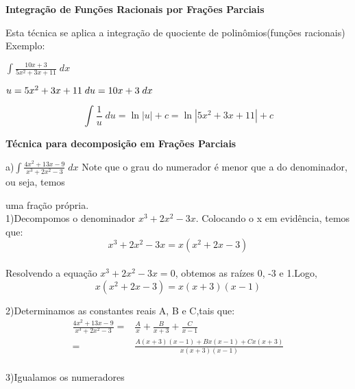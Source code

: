\documentclass[11pt]{article}
\begin{document}
\noindent
    \begin{center}
    {\Large{\bf Integração de Funções Racionais por Frações Parciais}}
    \end{center}
\vspace{.5cm}

Esta técnica se aplica a integração de quociente de polinômios(funções racionais)\\Exemplo:

\begin{center}
\begin{minipage}[c]{6cm}
 $\displaystyle\int\frac{10x+3}{5x^{2}+3x+11}\; dx$
\end{minipage}
\begin{minipage}[c]{6cm}
$u=5x^{2}+3x+11\\\;du=10x+3\;dx$
\end{minipage}
\end{center}

\vspace{.5cm}
$$\displaystyle\int\frac{1}{u}\;du=\ln|u|+c=\ln|5x^{2}+3x+11|+c$$
\begin{center}
    {\Large{\bf Técnica para decomposição em Frações Parciais}}
\end{center}
\vspace{.5cm} a)$\displaystyle\int\frac{4x^{2}+13x-9}{x^{3}+2x^{2}-3}\;dx$
\; Note que o grau do numerador é menor que a do denominador, ou seja, temos

\qquad \qquad\qquad \qquad \; \; uma fração própria.\\

1)Decompomos o denominador $x^{3}+2x^{2}-3x$.
 Colocando o x em evidência, temos que:\\
 $$x^{3}+2x^{2}-3x=x(x^{2}+2x-3)$$ \\

   Resolvendo a equação $x^{3}+2x^{2}-3x=0$, obtemos as raízes 0, -3 e 1.Logo,\\   $$x(x^{2}+2x-3)= x(x+3)(x-1)$$

2)Determinamos as constantes reais A, B e C,tais que:
\begin{align*}
 \displaystyle\frac{4x^{2}+13x-9}{x^{3}+2x^{2}-3}=&\frac{A}{x}+\frac{B}{x+3}+\frac{C}{x-1}\\
   =&
\frac{A(x+3)(x-1)+Bx(x-1)+Cx(x+3)}{x(x+3)(x-1)}\\
\end{align*}

3)Igualamos os numeradores \\
\end{document}
